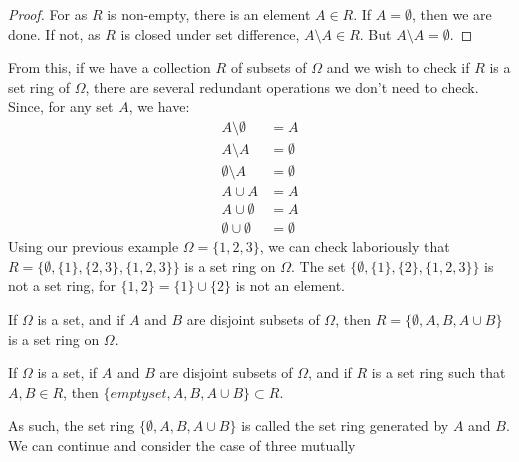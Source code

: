                 \begin{proof}
                    For as $R$ is non-empty, there is an element
                    $A\in{R}$. If $A=\emptyset$, then we are done.
                    If not, as $R$ is closed under set difference,
                    $A\setminus{A}\in{R}$. But
                    $A\setminus{A}=\emptyset$.
                \end{proof}
                From this, if we have a collection $R$ of subsets of
                $\Omega$ and we wish to check if $R$ is a set ring
                of $\Omega$, there are several redundant operations
                we don't need to check. Since, for any set $A$,
                we have:
                \begin{align}
                    A\setminus\emptyset&=A\\
                    A\setminus{A}&=\emptyset\\
                    \emptyset\setminus{A}&=\emptyset\\
                    A\cup{A}&=A\\
                    A\cup\emptyset&=A\\
                    \emptyset\cup\emptyset&=\emptyset
                \end{align}
                Using our previous example $\Omega=\{1,2,3\}$,
                we can check laboriously that
                $R=\{\emptyset,\{1\},\{2,3\},\{1,2,3\}\}$ is a
                set ring on $\Omega$. The set
                $\{\emptyset,\{1\},\{2\},\{1,2,3\}\}$ is not
                a set ring, for $\{1,2\}=\{1\}\cup\{2\}$ is not
                an element.
                \begin{theorem}
                    If $\Omega$ is a set, and if $A$ and $B$ are
                    disjoint subsets of $\Omega$, then
                    $R=\{\emptyset,A,B,A\cup{B}\}$ is a set ring
                    on $\Omega$.
                \end{theorem}
                \begin{theorem}
                    If $\Omega$ is a set, if $A$ and $B$ are
                    disjoint subsets of $\Omega$, and if
                    $R$ is a set ring such that $A,B\in{R}$,
                    then $\{emptyset,A,B,A\cup{B}\}\subset{R}$.
                \end{theorem}
                As such, the set ring $\{\emptyset,A,B,A\cup{B}\}$
                is called the set ring generated by $A$ and $B$. We
                can continue and consider the case of three mutually
